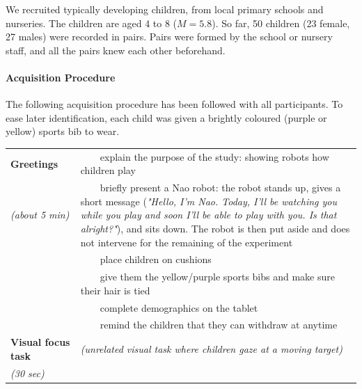 \documentclass{article}
\begin{document}
We recruited typically developing children, from local primary schools and
nurseries. The children are aged 4 to 8 ($M=5.8$). So far, 50 children (23
female, 27 males) were recorded in pairs. Pairs were formed by the school or
nursery staff, and all the pairs knew each other beforehand.

\paragraph{Acquisition Procedure}

The following acquisition procedure has been followed with all participants. To
ease later identification, each child was given a brightly coloured (purple or yellow)
sports bib to wear.

\newcommand{\tabitem}{~~\llap{\textbullet}~~}
    \begin{tabular}{@{}p{0.2\linewidth}p{0.8\linewidth}@{}}
\toprule
\bf Greetings                     & \tabitem explain the purpose of the study: showing robots how children play  \\
\emph{(about 5 min)}              & \tabitem briefly present a Nao robot: the robot stands up, gives a short
                                    message (\emph{"Hello, I'm Nao. Today, I'll be watching you while you
                                    play and soon I'll be able to play with you. Is that alright?"}), and
                                    sits down. The robot is then put aside and does not intervene
                                    for the remaining of the experiment \\
                                  & \tabitem place children on cushions \\ 
                                  & \tabitem give them the yellow/purple sports
                                  bibs and make sure their hair is tied \\ 
                                  & \tabitem complete demographics on the tablet \\
                                  & \tabitem remind the children that they can withdraw at anytime \\ \midrule
\bf Visual focus task             & \emph{(unrelated visual task where children gaze at a moving target)}\\ 
\emph{(30 sec)}                   & \\ \midrule

\end{tabular}
\end{document}
